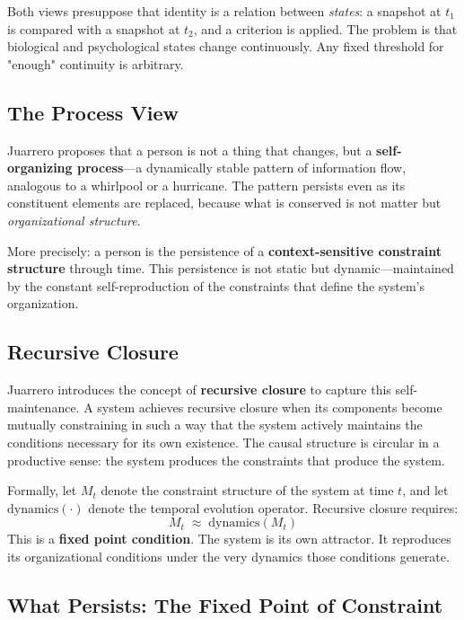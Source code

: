 \documentclass[11pt]{article}
\begin{document}
Both views presuppose that identity is a relation between \emph{states}: a snapshot at
$t_1$ is compared with a snapshot at $t_2$, and a criterion is applied. The problem is
that biological and psychological states change continuously. Any fixed threshold for
"enough" continuity is arbitrary.

\subsection{The Process View}

Juarrero proposes that a person is not a thing that changes, but a \textbf{self-organizing
process}---a dynamically stable pattern of information flow, analogous to a whirlpool or a
hurricane. The pattern persists even as its constituent elements are replaced, because
what is conserved is not matter but \emph{organizational structure}.

More precisely: a person is the persistence of a \textbf{context-sensitive constraint
structure} through time. This persistence is not static but dynamic---maintained by the
constant self-reproduction of the constraints that define the system's organization.

\subsection{Recursive Closure}

Juarrero introduces the concept of \textbf{recursive closure} to capture this
self-maintenance. A system achieves recursive closure when its components become mutually
constraining in such a way that the system actively maintains the conditions necessary for
its own existence. The causal structure is circular in a productive sense: the system
produces the constraints that produce the system.

Formally, let $M_t$ denote the constraint structure of the system at time $t$, and let
$\mathrm{dynamics}(\cdot)$ denote the temporal evolution operator. Recursive closure
requires:
\[
M_t \;\approx\; \mathrm{dynamics}(M_t)
\]
This is a \textbf{fixed point condition}. The system is its own attractor. It reproduces
its organizational conditions under the very dynamics those conditions generate.

\subsection{What Persists: The Fixed Point of Constraint}
\end{document}
